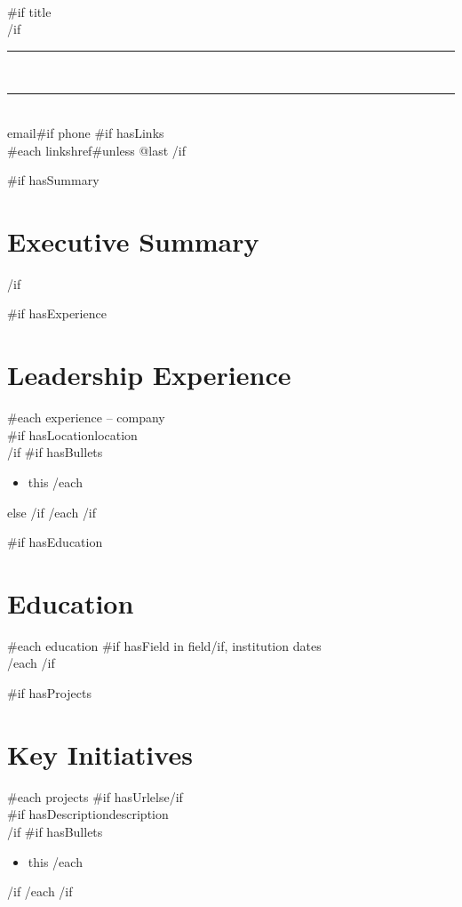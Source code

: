 \documentclass[11pt,a4paper]{article}
\newcommand{\executiverule}{\noindent\rule{\linewidth}{0.6pt}\\[1pt]\rule{\linewidth}{0.3pt}}
\begin{document}
\begin{center}
  {\Huge {}\relax{}}\\[4pt]
  {{#if title}}{\Large\itshape {}\relax{}}\\[6pt]
  {{/if}}
  \executiverule\\[4pt]
  {{email}}{{#if phone}}  
  {{#if hasLinks}}\\[2pt]
  {{#each links}}{{href}}{{#unless @last}} 
  {{/if}}
\end{center}

\vspace{8pt}

{{#if hasSummary}}
\section*{Executive Summary}
\begin{center}
\parbox{0.92\linewidth}{\centering {}\relax{}}
\end{center}
{{/if}}

{{#if hasExperience}}
\section*{Leadership Experience}
{{#each experience}}
\textbf{\relax{}} -- {{company}} \hfill \textit{\relax{}}\\
{{#if hasLocation}}{{location}}\\
{{/if}}
{{#if hasBullets}}
\begin{itemize}
{{#each bullets}}\item {{this}}
{{/each}}
\end{itemize}
{{else}}
\vspace{4pt}
{{/if}}
{{/each}}
{{/if}}

{{#if hasEducation}}
\section*{Education}
{{#each education}}
\textbf{\relax{}}{{#if hasField}} in {{field}}{{/if}}, {{institution}} \hfill {{dates}}\\
{{/each}}
{{/if}}

{{#if hasProjects}}
\section*{Key Initiatives}
{{#each projects}}
{{#if hasUrl}}\textbf{\relax{}}{{else}}\textbf{\relax{}}{{/if}}\\
{{#if hasDescription}}{{description}}\\
{{/if}}
{{#if hasBullets}}
\begin{itemize}
{{#each bullets}}\item {{this}}
{{/each}}
\end{itemize}
{{/if}}
{{/each}}
{{/if}}
\end{document}
